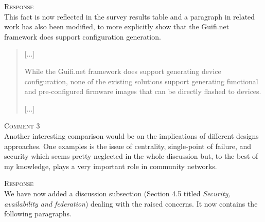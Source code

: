 \documentclass[12pt,twoside,a4paper]{report}
\begin{document}
\vspace{0.5cm}\noindent\textsc{Response}\\
This fact is now reflected in the survey results table and a paragraph in related work has also been modified, to more explicitly show that the Guifi.net framework does support configuration generation.

\begin{quote}
[...]

While the Guifi.net framework does support generating device configuration, none of the existing solutions support generating functional and pre-configured firmware images that can be directly flashed to devices.

[...]
\end{quote}

\vspace{0.5cm}\noindent\textsc{Comment 3}\\
Another interesting comparison would be on the implications of different designs approaches. One examples is the issue of centrality, single-point of failure, and security which seems pretty neglected in the whole discussion but, to the best of my knowledge, plays a very important role in community networks.

\vspace{0.5cm}\noindent\textsc{Response}\\
We have now added a discussion subsection (Section 4.5 titled \textit{Security, availability and federation}) dealing with the raised concerns.
It now contains the following paragraphs.
\end{document}
